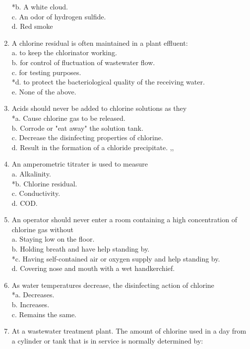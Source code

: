 \begin{enumerate}
*b. A white cloud. \\
c. An odor of hydrogen sulfide. \\
d. Red smoke \\
\item A chlorine residual is often maintained in a plant effluent: \\
a. to keep the chlorinator working. \\
b. for control of fluctuation of wastewater flow. \\
c. for testing purposes. \\
*d. to protect the bacteriological quality of the receiving water. \\
e. None of the above. \\
\item Acids should never be added to chlorine solutions as they \\
*a. Cause chlorine gas to be released. \\
b. Corrode or "eat away" the solution tank. \\
c. Decrease the disinfecting properties of chlorine. \\
d. Result in the formation of a chloride precipitate.
,, \\
\item An amperometric titrater is used to measure \\
a. Alkalinity. \\
*b. Chlorine residual. \\
c. Conductivity. \\
d. COD. \\
\item An operator should never enter a room containing a high concentration of chlorine gas without \\
a. Staying low on the floor. \\
b. Holding breath and have help standing by. \\
*c. Having self-contained air or oxygen supply and help standing by. \\
d. Covering nose and mouth with a wet handkerchief. \\
\item As water temperatures decrease, the disinfecting action of chlorine \\
*a. Decreases. \\
b. Increases. \\
c. Remains the same. \\
\item At a wastewater treatment plant. The amount of chlorine used in a day from a cylinder or tank that is in service is normally determined by: \\

\end{enumerate}
